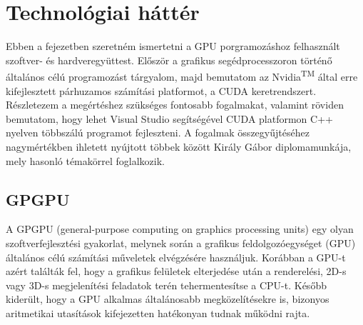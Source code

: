 \chapter{Technológiai háttér} \label{technologyChapter}
Ebben a fejezetben szeretném ismertetni a GPU porgramozáshoz felhasznált szoftver- és hardveregyüttest. Először a grafikus segédprocesszoron történő általános célú programozást tárgyalom, majd bemutatom az Nvidia\textsuperscript{TM} által erre kifejlesztett párhuzamos számítási platformot, a CUDA keretrendszert. Részletezem a megértéshez szükséges fontosabb fogalmakat, valamint röviden bemutatom, hogy lehet Visual Studio segítségével CUDA platformon C++ nyelven többszálú programot fejleszteni. A fogalmak összegyűjtéséhez nagymértékben ihletett nyújtott többek között Király Gábor diplomamunkája, mely hasonló témakörrel foglalkozik. \cite{kvantum_optim}

\section{GPGPU}
A GPGPU (general-purpose computing on graphics processing units) egy olyan
szoftverfejlesztési gyakorlat, melynek során a grafikus feldolgozóegységet (GPU) általános
célú számítási műveletek elvégzésére használjuk. \cite{kvantum_optim} Korábban a GPU-t azért találták fel, hogy a grafikus felületek elterjedése után a renderelési, 2D-s vagy 3D-s megjelenítési feladatok terén tehermentesítse a CPU-t. Később kiderült, hogy a GPU alkalmas általánosabb megközelítésekre is, bizonyos aritmetikai utasítások kifejezetten hatékonyan tudnak működni rajta.

